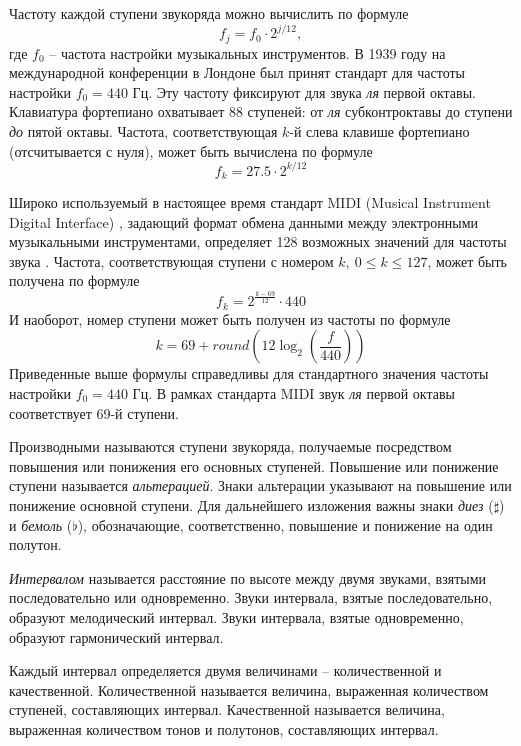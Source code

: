 Частоту каждой ступени звукоряда можно вычислить по формуле
\begin{equation}
\label{eq:note_freq}
f_j = f_0 \cdot 2^{j/12},
\end{equation}
где $f_0$ -- частота настройки музыкальных инструментов. В 1939 году на
международной конференции в Лондоне был принят стандарт для частоты настройки
$f_0 = 440$ Гц. Эту частоту фиксируют для звука \emph{ля} первой октавы.
Клавиатура фортепиано охватывает 88 ступеней: от \emph{ля} субконтроктавы до
ступени \emph{до} пятой октавы. Частота, соответствующая $k$-й слева клавише
фортепиано (отсчитывается с нуля), может быть вычислена по формуле $$f_k = 27.5
\cdot 2^{k/12}$$

Широко используемый в настоящее время стандарт MIDI (Musical Instrument
Digital Interface) \cite{MIDI}, задающий формат обмена данными между
электронными музыкальными инструментами, определяет 128 возможных значений для
частоты звука \cite{MIDITuning}. Частота, соответствующая ступени с номером
$k,~0 \leq k \leq 127$, может быть получена по формуле $$f_k = 2^{\frac{k -
69}{12}} \cdot 440$$ И наоборот, номер ступени может быть получен из частоты по
формуле
\begin{equation}
\label{eq:fton}
k = 69 + round \left( 12 \log_2 \left( \frac{f}{440} \right) \right)
\end{equation}
Приведенные выше формулы справедливы для стандартного значения частоты
настройки $f_0 = 440$ Гц. В рамках стандарта MIDI звук \emph{ля} первой октавы
соответствует 69-й ступени.

Производными называются ступени звукоряда, получаемые посредством повышения или
понижения его основных ступеней. Повышение или понижение ступени называется
\emph{альтерацией}. Знаки альтерации указывают на повышение или понижение
основной ступени. Для дальнейшего изложения важны знаки \emph{диез} ($\sharp$) и
\emph{бемоль} ($\flat$), обозначающие, соответственно, повышение и понижение на
один полутон.

\emph{Интервалом} называется расстояние по высоте между двумя звуками, взятыми
последовательно или одновременно. Звуки интервала, взятые последовательно,
образуют мелодический интервал. Звуки интервала, взятые одновременно, образуют
гармонический интервал.

Каждый интервал определяется двумя величинами -- количественной и качественной.
Количественной называется величина, выраженная количеством ступеней,
составляющих интервал. Качественной называется величина, выраженная количеством
тонов и полутонов, составляющих интервал.

